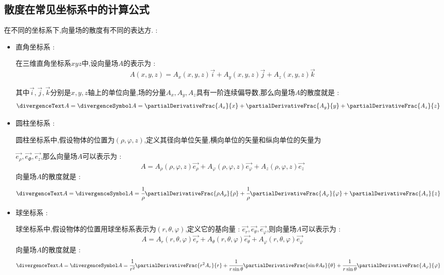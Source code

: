 {{{    \subsection{散度在常见坐标系中的计算公式}{
      在不同的坐标系下,向量场的散度有不同的表达方. :
      \begin{itemize}
        \item {
              直角坐标系 :

              在三维直角坐标系$xyz$中,设向量场$A$的表示为 :
              $$
                A(x,y,z) = A_x(x,y,z)\vec{i} + A_y(x,y,z)\vec{j} + A_z(x,y,z)\vec{k}
              $$

              其中$\vec{i},\vec{j},\vec{k}$分别是$x,y,z$轴上的单位向量,场的分量$A_x,A_y,A_z$具有一阶连续偏导数,那么向量场$A$的散度就是 :
              $$
                \divergenceText A = \divergenceSymbol A = \partialDerivativeFrac{A_x}{x} + \partialDerivativeFrac{A_y}{y} + \partialDerivativeFrac{A_z}{z}
              $$
              }
        \item {
              圆柱坐标系 :

              圆柱坐标系中,假设物体的位置为$(\rho,\varphi,z)$,定义其径向单位矢量,横向单位的矢量和纵向单位的矢量为

              $\vec{e_{\rho}},\vec{e_{\varPhi}},\vec{e_z}$,那么向量场$A$可以表示为 :
              $$
                A = A_{\rho}(\rho,\varphi,z)\vec{e_{\rho}} + A_{\varphi}(\rho,\varphi,z)\vec{e_{\varphi}} + A_{z}(\rho,\varphi,z)\vec{e_{z}}
              $$
              向量场$A$的散度就是 :
              $$
                \divergenceText A = \divergenceSymbol A = \cfrac{1}{\rho}\partialDerivativeFrac{\rho A_\rho}{\rho} + \cfrac{1}{\rho}\partialDerivativeFrac{A_\varphi}{\varphi} + \partialDerivativeFrac{A_z}{z}
              $$
              }
        \item {
              球坐标系 :

              球坐标系中,假设物体的位置用球坐标系表示为$(r,\theta,\varphi)$,定义它的基向量 : $\vec{e_r},\vec{e_\theta},\vec{e_\varphi}$,则向量场$A$可以表示为 :
              $$
                A = A_r(r,\theta,\varphi)\vec{e_r} + A_\theta(r,\theta,\varphi)\vec{e_\theta} + A_\varphi(r,\theta,\varphi)\vec{e_\varphi}
              $$
              向量场$A$的散度就是 :
              $$
                \divergenceText A = \divergenceSymbol A = \cfrac{1}{r^2}\partialDerivativeFrac{r^2A_r}{r} + \cfrac{1}{r\sin\theta}\partialDerivativeFrac{\sin\theta A_\theta}{\theta} + \cfrac{1}{r\sin\theta}\partialDerivativeFrac{A_\varphi}{\varphi}
              $$
              }
      \end{itemize}
    }%

}}}
